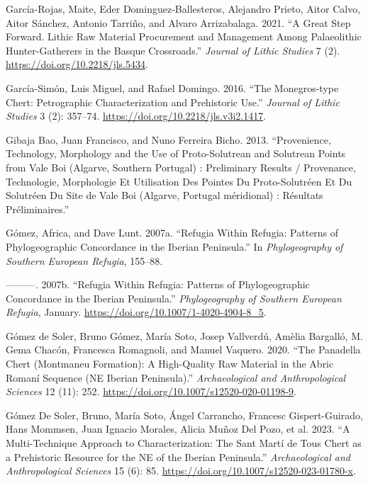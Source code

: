 \documentclass[
  a4paper,
  DIV=11,
  numbers=noendperiod]{scrreprt}
\newlength{\cslhangindent}
\newenvironment{CSLReferences}[2] %
 {\begin{list}{}{%
  \setlength{\itemindent}{0pt}
  \setlength{\leftmargin}{0pt}
  \setlength{\parsep}{0pt}
  \ifodd #1
   \setlength{\leftmargin}{\cslhangindent}
   \setlength{\itemindent}{-1\cslhangindent}
  \fi
  \setlength{\itemsep}{#2\baselineskip}}}
 {\end{list}}
\begin{document}
\begin{CSLReferences}{1}{0}
García-Rojas, Maite, Eder Dominguez-Ballesteros, Alejandro Prieto, Aitor
Calvo, Aitor Sánchez, Antonio Tarriño, and Alvaro Arrizabalaga. 2021.
{``A {Great Step Forward}. {Lithic Raw Material Procurement} and
{Management} Among {Palaeolithic Hunter-Gatherers} in the {Basque
Crossroads}.''} \emph{Journal of Lithic Studies} 7 (2).
\url{https://doi.org/10.2218/jls.5434}.

García-Simón, Luis Miguel, and Rafael Domingo. 2016. {``The
{Monegros-type} Chert: {Petrographic} Characterization and Prehistoric
Use.''} \emph{Journal of Lithic Studies} 3 (2): 357--74.
\url{https://doi.org/10.2218/jls.v3i2.1417}.

Gibaja Bao, Juan Francisco, and Nuno Ferreira Bicho. 2013.
{``Provenience, Technology, Morphology and the Use of Proto-Solutrean
and Solutrean Points from {Vale Boi} ({Algarve}, Southern Portugal) :
Preliminary Results / {Provenance}, Technologie, Morphologie Et
Utilisation Des Pointes Du Proto-Solutr{é}en Et Du Solutr{é}en Du Site
de {Vale Boi} ({Algarve}, {Portugal} m{é}ridional) : R{é}sultats
Pr{é}liminaires.''}

Gómez, Africa, and Dave Lunt. 2007a. {``Refugia Within Refugia: Patterns
of Phylogeographic Concordance in the Iberian Peninsula.''} In
\emph{Phylogeography of Southern European Refugia}, 155--88.

---------. 2007b. {``Refugia Within Refugia: Patterns of Phylogeographic
Concordance in the Iberian Peninsula.''} \emph{Phylogeography of
Southern European Refugia}, January.
\url{https://doi.org/10.1007/1-4020-4904-8_5}.

Gómez de Soler, Bruno Gómez, María Soto, Josep Vallverdú, Amèlia
Bargalló, M. Gema Chacón, Francesca Romagnoli, and Manuel Vaquero. 2020.
{``The {Panadella} Chert ({Montmaneu Formation}): A High-Quality Raw
Material in the {Abric Roman{í}} Sequence ({NE Iberian Peninsula}).''}
\emph{Archaeological and Anthropological Sciences} 12 (11): 252.
\url{https://doi.org/10.1007/s12520-020-01198-9}.

Gómez De Soler, Bruno, María Soto, Ángel Carrancho, Francesc
Gispert-Guirado, Hans Mommsen, Juan Ignacio Morales, Alicia Muñoz Del
Pozo, et al. 2023. {``A Multi-Technique Approach to Characterization:
The {Sant Mart{í}} de {Tous} Chert as a Prehistoric Resource for the
{NE} of the {Iberian Peninsula}.''} \emph{Archaeological and
Anthropological Sciences} 15 (6): 85.
\url{https://doi.org/10.1007/s12520-023-01780-x}.


\end{CSLReferences}
\end{document}
